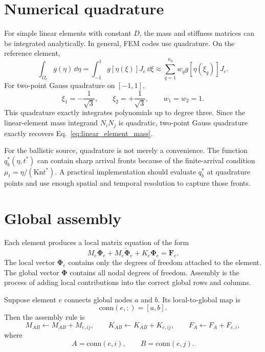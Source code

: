 \documentclass[11pt]{article}
\begin{document}
\section{Numerical quadrature}
For simple linear elements with constant \(D\), the mass and stiffness matrices can be integrated analytically. In general, FEM codes use quadrature. On the reference element,
\begin{equation}
    \int_{\Omega_e}g(\eta)\,\dd\eta
    =\int_{-1}^{1}g[\eta(\xi)]J_e\,\dd\xi
    \approx\sum_{q=1}^{n_q}w_q g[\eta(\xi_q)]J_e.
\end{equation}
For two-point Gauss quadrature on \([-1,1]\),
\begin{equation}
    \xi_1=-\frac{1}{\sqrt{3}},
    \qquad
    \xi_2=+\frac{1}{\sqrt{3}},
    \qquad
    w_1=w_2=1.
\end{equation}
This quadrature exactly integrates polynomials up to degree three. Since the linear-element mass integrand \(N_iN_j\) is quadratic, two-point Gauss quadrature exactly recovers Eq.~\eqref{eq:linear_element_mass}.

For the ballistic source, quadrature is not merely a convenience. The function \(q_b^*(\eta,t^*)\) can contain sharp arrival fronts because of the finite-arrival condition \(\mu_t=\eta/(\mathrm{Kn}t^*)\). A practical implementation should evaluate \(q_b^*\) at quadrature points and use enough spatial and temporal resolution to capture those fronts.

\section{Global assembly}
Each element produces a local matrix equation of the form
\begin{equation}
    M_e\ddot{\bm{\Phi}}_e+M_e\dot{\bm{\Phi}}_e+K_e\bm{\Phi}_e=\bm{F}_e.
\end{equation}
The local vector \(\bm{\Phi}_e\) contains only the degrees of freedom attached to the element. The global vector \(\bm{\Phi}\) contains all nodal degrees of freedom. Assembly is the process of adding local contributions into the correct global rows and columns.

Suppose element \(e\) connects global nodes \(a\) and \(b\). Its local-to-global map is
\begin{equation}
    \mathrm{conn}(e,:)=[a,b].
\end{equation}
Then the assembly rule is
\begin{equation}
    M_{A B}\leftarrow M_{A B}+M_{e,ij},
    \qquad
    K_{A B}\leftarrow K_{A B}+K_{e,ij},
    \qquad
    F_A\leftarrow F_A+F_{e,i},
\end{equation}
where
\begin{equation}
    A=\mathrm{conn}(e,i),
    \qquad
    B=\mathrm{conn}(e,j).
\end{equation}
\end{document}
